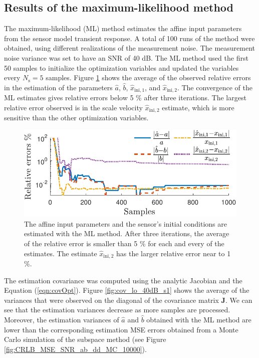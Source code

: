 \subsection{Results of the maximum-likelihood method}
\color{blue} 
The maximum-likelihood (ML) method estimates the affine input parameters from the sensor model transient response.
A total of 100 runs of the method were obtained, using different realizations of the measurement noise.
The measurement noise variance was set to have an SNR of 40 dB.
The ML method used the first 50 samples to initialize the optimization variables and updated the variables every $N_{\mathrm{s}} = 5$ samples.
Figure \ref{fig:rele_lo_40dB_s10} shows the average of the observed relative errors in the estimation of the parameters $\widehat{a}$, $\widehat{b}$, $\widehat{x}_{\mathrm{ini,1}}$, and $\widehat{x}_{\mathrm{ini,2}}$\color{black}.
The convergence of the ML estimates gives relative errors below 5 \% after three iterations.
The largest relative error observed is in the scale velocity $\widehat{x}_{\mathrm{ini,2}}$ estimate, which is more sensitive than the other optimization variables.


\begin{figure}[!htbp]
\centering
\includegraphics[width=0.69\columnwidth]{./ChapterRampInput/fig/Fig_7.pdf} 
\caption{ \label{fig:rele_lo_40dB_s10} The affine input parameters and the sensor's initial conditions are estimated with the ML method. After three iterations, \color{blue} the average of the relative error is smaller than 5 \% for each and every of the estimates. The estimate $\widehat{x}_{\mathrm{ini,2}}$ has the larger relative error near to 1 \%. \color{black} }
\end{figure}

The estimation covariance was computed using the analytic Jacobian and the Equation (\ref{eqn:covOpt}).
Figure \ref{fig:cov_lo_40dB_s1} shows \color{blue} the average \color{black} of the variances that were observed on the diagonal of the covariance matrix $\mathbf{J}$. 
We can see that the estimation variances decrease as more samples are processed.
Moreover, the estimation variances of $\widehat{a}$ and $\widehat{b}$ obtained with the ML method are lower than 
the corresponding estimation MSE errors obtained from a Monte Carlo simulation of the subspace method (see Figure \ref{fig:CRLB_MSE_SNR_ab_dd_MC_10000}).
  
